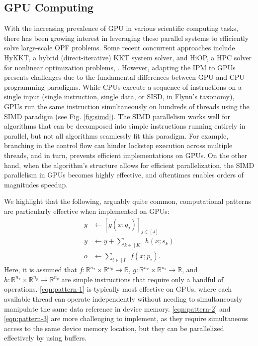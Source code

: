 \subsection{GPU Computing}\label{sec:gpu}
With the increasing prevalence of GPU in various scientific computing
tasks, there has been growing interest in leveraging these parallel
systems to efficiently solve large-scale OPF problems. Some recent
concurrent approaches include HyKKT, a hybrid (direct-iterative) KKT
system solver, \cite{regev2023hykkt} and HiOP, a HPC solver for
nonlinear optimization problems, \cite{hiop_techrep}. However,
adapting the IPM to GPUs presents challenges due to the fundamental
differences between GPU and CPU programming paradigms. While CPUs
execute a sequence of instructions on a single input (single
instruction, single data, or SISD, in Flynn's taxonomy), GPUs run the
same instruction simultaneously on hundreds of threads using the SIMD
paradigm (see Fig. \ref{fig:simd}). The SIMD parallelism works well
for algorithms that can be decomposed into simple instructions running
entirely in parallel, but not all algorithms seamlessly fit this
paradigm. For example, branching in the control flow can hinder
lockstep execution across multiple threads, and in turn, prevents
efficient implementations on GPUs. On the other hand, when the
algorithm's structure allows for efficient parallelization, the SIMD
parallelism in GPUs becomes highly effective, and oftentimes enables
orders of magnitudes speedup.

We highlight that the following, arguably quite common, computational
patterns are particularly effective when implemented on GPUs:
\begin{align}
  y&\leftarrow \left[g(x; q_j)\right]_{j\in [J]}\tag{Pattern 1}\label{eqn:pattern-1}\\
  y&\leftarrow y + \sum_{k\in [K]} h(x;s_k)\tag{Pattern 2}\label{eqn:pattern-2}\\
  o&\leftarrow \sum_{i\in [I]} f(x; p_i)\tag{Pattern 3}\label{eqn:pattern-3}.
\end{align}
Here, it is assumed that $f:\mathbb{R}^{n_x}\times
\mathbb{R}^{n_{p}}\rightarrow \mathbb{R}$, $g:\mathbb{R}^{n_x}\times
\mathbb{R}^{n_{s}}\rightarrow \mathbb{R}$, and
$h:\mathbb{R}^{n_x}\times \mathbb{R}^{n_{p}}\rightarrow
\mathbb{R}^{n_y}$ are simple instructions that require only a handful
of operations. \ref{eqn:pattern-1} is typically most effective on
GPUs, where each available thread can operate independently without
needing to simultaneously manipulate the same data reference in device
memory. \ref{eqn:pattern-2} and \ref{eqn:pattern-3} are more
challenging to implement, as they require simultaneous access to the
same device memory location, but they can be parallelized effectively
by using buffers.


